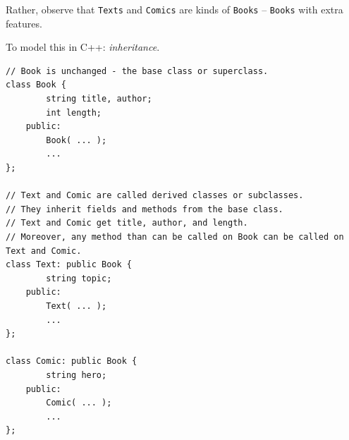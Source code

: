 \documentclass[11pt]{article}
\theoremstyle{definition}
\begin{document}
Rather, observe that {\tt Texts} and {\tt Comics} are kinds of {\tt Books} -- {\tt Books} with extra features.

To model this in C++: {\it inheritance}.
\begin{lstlisting}
// Book is unchanged - the base class or superclass.
class Book {
        string title, author;
        int length;
    public:
        Book( ... );
        ...
};

// Text and Comic are called derived classes or subclasses.
// They inherit fields and methods from the base class.
// Text and Comic get title, author, and length.
// Moreover, any method than can be called on Book can be called on Text and Comic.
class Text: public Book {
        string topic;
    public:
        Text( ... );
        ...
};

class Comic: public Book {
        string hero;
    public:
        Comic( ... );
        ...
};
\end{lstlisting}
\end{document}
